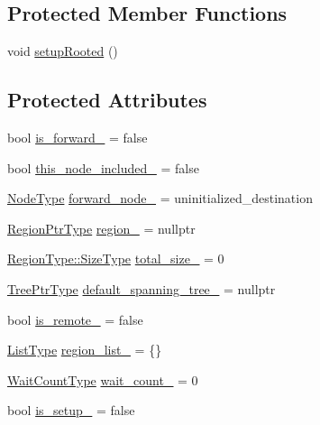 \subsection*{Protected Member Functions}
\begin{DoxyCompactItemize}
\item 
void \hyperlink{structvt_1_1group_1_1_info_rooted_a8ac61be5b1f7b5316db4d7bd74f46389}{setup\+Rooted} ()
\end{DoxyCompactItemize}
\subsection*{Protected Attributes}
\begin{DoxyCompactItemize}
\item 
bool \hyperlink{structvt_1_1group_1_1_info_rooted_a3d83fb54519ec397f94bccd7f102734a}{is\+\_\+forward\+\_\+} = false
\item 
bool \hyperlink{structvt_1_1group_1_1_info_rooted_a6612cb38c7b64ec23870b3805a812bf0}{this\+\_\+node\+\_\+included\+\_\+} = false
\item 
\hyperlink{namespacevt_a866da9d0efc19c0a1ce79e9e492f47e2}{Node\+Type} \hyperlink{structvt_1_1group_1_1_info_rooted_a04c0511b4cc3745e079f03b60d9bc189}{forward\+\_\+node\+\_\+} = uninitialized\+\_\+destination
\item 
\hyperlink{structvt_1_1group_1_1_info_rooted_a127ac5ebcfb9871621c1f66dba481c0b}{Region\+Ptr\+Type} \hyperlink{structvt_1_1group_1_1_info_rooted_a8a4129a53b81053b106c6f491a51205b}{region\+\_\+} = nullptr
\item 
\hyperlink{structvt_1_1group_1_1region_1_1_region_a9bb381adf31111aae34dbc644bad6c1f}{Region\+Type\+::\+Size\+Type} \hyperlink{structvt_1_1group_1_1_info_rooted_aa11ba8b4e8174e4a232e3375c4873b29}{total\+\_\+size\+\_\+} = 0
\item 
\hyperlink{structvt_1_1group_1_1_info_base_af1111ac71e1ee7a009f00ebece27c3a3}{Tree\+Ptr\+Type} \hyperlink{structvt_1_1group_1_1_info_rooted_a22bd6307d7ab65ff48b126f1b9dcf9e2}{default\+\_\+spanning\+\_\+tree\+\_\+} = nullptr
\item 
bool \hyperlink{structvt_1_1group_1_1_info_rooted_ae35381afa327833a2b9f4bb758703a11}{is\+\_\+remote\+\_\+} = false
\item 
\hyperlink{structvt_1_1group_1_1_info_rooted_aab859fcabc7b137db51af4af86ebe56d}{List\+Type} \hyperlink{structvt_1_1group_1_1_info_rooted_a51a1676e5c5d5a76543db96f7d8d893b}{region\+\_\+list\+\_\+} = \{\}
\item 
\hyperlink{structvt_1_1group_1_1_info_base_a0924de8df3a2ec72ebdd499ad8a28abf}{Wait\+Count\+Type} \hyperlink{structvt_1_1group_1_1_info_rooted_af4f9a1defdcf2c7242b25c45f319d224}{wait\+\_\+count\+\_\+} = 0
\item 
bool \hyperlink{structvt_1_1group_1_1_info_rooted_a15e10cbd49b9f1a70c1a1524ba91d3d8}{is\+\_\+setup\+\_\+} = false
\end{DoxyCompactItemize}


